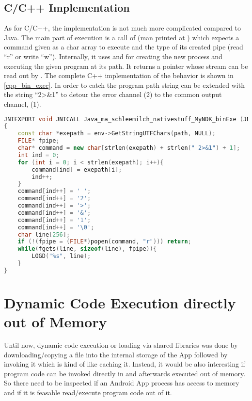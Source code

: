 \subsection{C/C++ Implementation}\label{dyn_bin_c}
As for C/C++, the implementation is not much more complicated compared to Java.
The main part of execution is a call of  
(man printed at \parencite{popen}) which expects a command 
given as a char array to execute and the type of its created pipe (read ``r'' or write ``w''). Internally, it uses  and  for creating the new 
process and executing the given program at its path. It returns a  pointer
whose stream can be read out by . The complete C++ implementation
of the behavior is shown in \autoref{cpp_bin_exec}. In order to catch 
the program path string can be extended with the string ``2>\&1'' to detour the error
channel (2) to the common output channel,  (1).
\begin{lstlisting}[language=C++, caption=C++ Native Exec(), label=cpp_bin_exec]
JNIEXPORT void JNICALL Java_ma_schleemilch_nativestuff_MyNDK_binExe (JNIEnv *env, object obj, jstring path)
{
	const char *exepath = env->GetStringUTFChars(path, NULL);
	FILE* fpipe;
	char* command = new char[strlen(exepath) + strlen(" 2>&1") + 1];
	int ind = 0;
	for (int i = 0; i < strlen(exepath); i++){
		command[ind] = exepath[i];
		ind++;
	}
	command[ind++] = ' ';
	command[ind++] = '2';
	command[ind++] = '>';
	command[ind++] = '&';
	command[ind++] = '1';
	command[ind++] = '\0';
	char line[256];
	if (!(fpipe = (FILE*)popen(command, "r"))) return;
	while(fgets(line, sizeof(line), fpipe)){
		LOGD("%s", line);
	}
}
\end{lstlisting}

\section{Dynamic Code Execution directly out of Memory}\label{section:dyn_code_memory}

Until now, dynamic code execution or loading via shared libraries was done
by downloading/copying a file into the internal storage of the App followed
by invoking it which is kind of like caching it. Instead,
it would be also interesting if program code can be invoked directly in and afterwards
executed out of memory. 
So there need to be inspected if an Android App process has access
to memory and if it is feasable read/execute program code out of it.   

